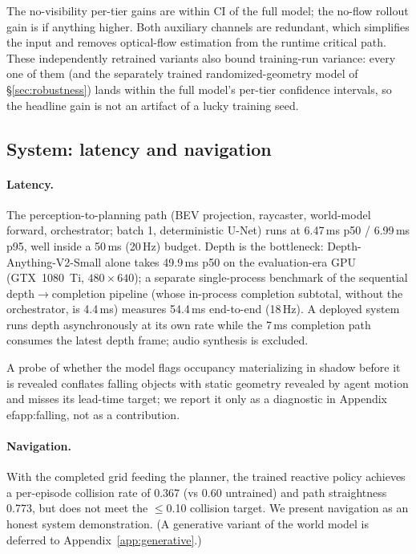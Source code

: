 \documentclass{article}
\begin{document}
The no-visibility per-tier gains are within CI of the full model; the no-flow rollout gain is if
anything higher. Both auxiliary channels are redundant, which simplifies the input and removes
optical-flow estimation from the runtime critical path. These independently retrained variants
also bound training-run variance: every one of them (and the separately trained
randomized-geometry model of \S\ref{sec:robustness}) lands within the full model's per-tier
confidence intervals, so the headline gain is not an artifact of a lucky training seed.

\subsection{System: latency and navigation}
\label{sec:system}

\paragraph{Latency.} The perception-to-planning path (BEV projection, raycaster, world-model
forward, orchestrator; batch 1, deterministic U-Net) runs at 6.47\,ms p50 / 6.99\,ms p95, well
inside a 50\,ms (20\,Hz) budget. Depth is the bottleneck: Depth-Anything-V2-Small alone takes
49.9\,ms p50 on the evaluation-era GPU (GTX~1080~Ti, $480{\times}640$); a separate
single-process benchmark of the sequential depth$\to$completion pipeline (whose in-process
completion subtotal, without the orchestrator, is 4.4\,ms) measures 54.4\,ms end-to-end
(18\,Hz). A deployed system runs depth asynchronously at its own
rate while the 7\,ms completion path consumes the latest depth frame; audio synthesis is excluded.

A probe of whether the model flags occupancy materializing in shadow before it is revealed
conflates falling objects with static geometry revealed by agent motion and misses its lead-time
target; we report it only as a diagnostic in Appendix~
ef{app:falling}, not as a contribution.

\paragraph{Navigation.} With the completed grid feeding the planner, the trained reactive policy achieves a
per-episode collision rate of 0.367 (vs 0.60 untrained) and path straightness 0.773, but does not
meet the $\le$0.10 collision target. We present navigation as an honest system demonstration.
(A generative variant of the world model is deferred to Appendix~\ref{app:generative}.)
\end{document}

